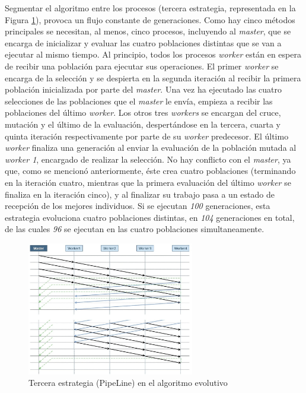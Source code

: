 	Segmentar el algoritmo entre los procesos (tercera estrategia, representada en la Figura \ref{fig:pev_mpi3}), provoca un flujo constante de generaciones. Como hay cinco métodos principales se necesitan, al menos, cinco procesos, incluyendo al \textit{master}, que se encarga de inicializar y evaluar las cuatro poblaciones distintas que se van a ejecutar al mismo tiempo. Al principio, todos los procesos \textit{worker} están en espera de recibir una población para ejecutar sus operaciones. El primer \textit{worker} se encarga de la selección y se despierta en la segunda iteración al recibir la primera población inicializada por parte del \textit{master}. Una vez ha ejecutado las cuatro selecciones de las poblaciones que el \textit{master} le envía, empieza a recibir las poblaciones del último \textit{worker}. Los otros tres \textit{workers} se encargan del cruce, mutación y el último de la evaluación, despertándose en la tercera, cuarta y quinta iteración respectivamente por parte de su \textit{worker} predecesor. El último \textit{worker} finaliza una generación al enviar la evaluación de la población mutada al \textit{worker 1}, encargado de realizar la selección. No hay conflicto con el \textit{master}, ya que, como se mencionó anteriormente, éste crea cuatro poblaciones (terminando en la iteración cuatro, mientras que la primera evaluación del último \textit{worker} se finaliza en la iteración cinco), y al finalizar su trabajo pasa a un estado de recepción de los mejores individuos. Si se ejecutan \textit{100} generaciones, esta estrategia evoluciona cuatro poblaciones distintas, en \textit{104} generaciones en total, de las cuales \textit{96} se ejecutan en las cuatro poblaciones simultaneamente.
	
	
		
	\begin{figure}[!h]
		\centering
		\includegraphics[width=0.65\textwidth]{images/chapter_3/pev_mpi3}
		\caption{Tercera estrategia (PipeLine) en el algoritmo evolutivo }
		\label{fig:pev_mpi3}
	\end{figure}

